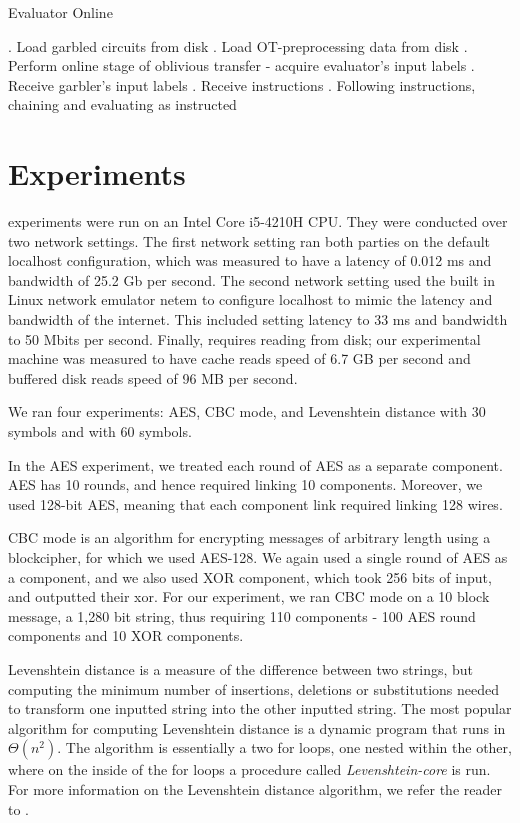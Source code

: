\begin{algorithm}
    \caption{Evaluator Online}
    \label{alg:evaluator-online}
    \begin{algorithmic}
        . Load garbled circuits from disk
        . Load OT-preprocessing data from disk
        . Perform online stage of oblivious transfer - acquire evaluator's input labels
        . Receive garbler's input labels
        . Receive instructions
        . Following instructions, chaining and evaluating as instructed
    \end{algorithmic}
\end{algorithm}

\section{Experiments}

\CompGC experiments were run on an Intel Core i5-4210H CPU. 
They were conducted over two network settings. 
The first network setting ran both parties on the default localhost configuration, which was measured to have a latency of 0.012 ms and bandwidth of 25.2 Gb per second. 
The second network setting used the built in Linux network emulator {\sf netem} to configure localhost to mimic the latency and bandwidth of the internet. 
This included setting latency to 33 ms and bandwidth to 50 Mbits per second. 
Finally, \CompGC requires reading from disk; our experimental machine was measured to have cache reads speed of 6.7 GB per second and buffered disk reads speed of 96 MB per second.

We ran four experiments: AES, CBC mode, and Levenshtein distance with 30 symbols and with 60 symbols. 

In the AES experiment, we treated each round of AES as a separate component. AES has 10 rounds, and hence required linking 10 components. Moreover, we used 128-bit AES, meaning that each component link required linking 128 wires. 

CBC mode is an algorithm for encrypting messages of arbitrary length using a blockcipher, for which we used AES-128. 
We again used a single round of AES as a component, and we also used XOR component, which took 256 bits of input, and outputted their xor. 
For our experiment, we ran CBC mode on a 10 block message, a 1,280 bit string, thus requiring 110 components - 100 AES round components and 10 XOR components. 

Levenshtein distance is a measure of the difference between two strings, but computing the minimum number of insertions, deletions or substitutions needed to transform one inputted string into the other inputted string. 
The most popular algorithm for computing Levenshtein distance is a dynamic program that runs in $\Theta(n^2)$. 
The algorithm is essentially a two for loops, one nested within the other, where on the inside of the for loops a procedure called \textit{Levenshtein-core} is run. 
For more information on the Levenshtein distance algorithm, we refer the reader to \cite{wiki-leven}. 

